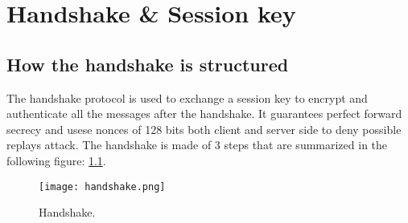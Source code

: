 
\chapter{Handshake \& Session key}
\label{cap:handshake-session-key}

\section{How the handshake is structured}

The handshake protocol is used to exchange a session key to encrypt and authenticate all the messages after the handshake. It guarantees perfect forward secrecy and usese nonces of 128 bits both client and server side to deny possible replays attack. The handshake is made of 3 steps that are summarized in the following figure: \ref{fig:handshake}.

\begin{figure}[!h] 
    \centering 
    \texttt{[image: handshake.png]} 
    \caption{Handshake.}
    \label{fig:handshake}
\end{figure}

